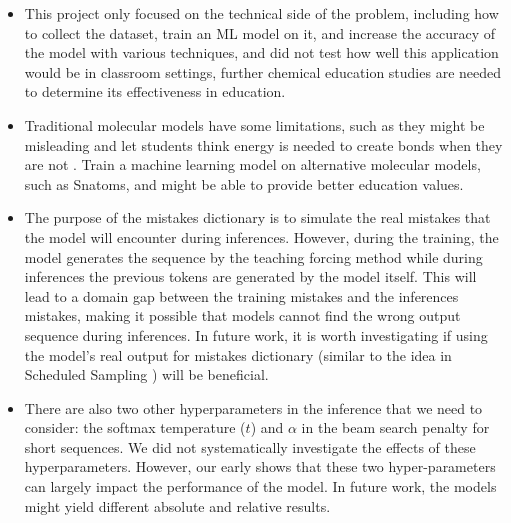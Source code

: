 \documentclass[12pt]{article}
\begin{document}
\begin{itemize}
\item This project only focused on the technical side of the problem, including how to collect the dataset, train an ML model on it, and increase the accuracy of the model with various techniques, and did not test how well this application would be in classroom settings, further chemical education studies are needed to determine its effectiveness in education. 

\item Traditional molecular models have some limitations, such as they might be misleading and let students think energy is needed to create bonds when they are not \autocite{snatoms}. Train a machine learning model on alternative molecular models, such as Snatoms\autocite{snatoms}, and might be able to provide better education values. 

\item  The purpose of the mistakes dictionary is to simulate the real mistakes that the model will encounter during inferences. However, during the training, the model generates the sequence by the teaching forcing method while during inferences the previous tokens are generated by the model itself. This will lead to a domain gap between the training mistakes and the inferences mistakes, making it possible that models cannot find the wrong output sequence during inferences. In future work, it is worth investigating if using the model's real output for mistakes dictionary (similar to the idea in Scheduled Sampling \autocite{bengio_scheduled_2015}) will be beneficial. 

\item There are also two other hyperparameters in the inference that we need to consider: the softmax temperature ($t$) and $\alpha$ in the beam search penalty for short sequences. We did not systematically investigate the effects of these hyperparameters. However, our early shows that these two hyper-parameters can largely impact the performance of the model. In future work, the models might yield different absolute and relative results.      

\end{itemize}
\end{document}
